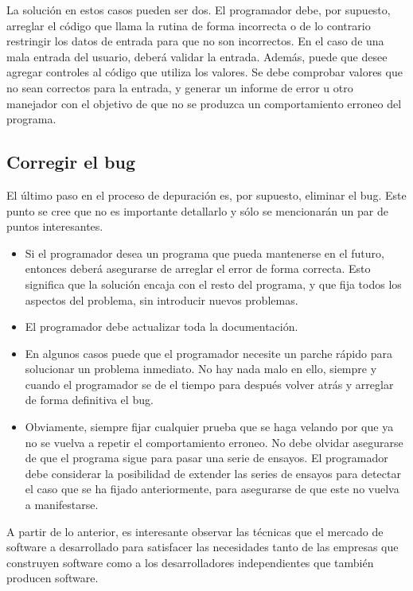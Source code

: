 \documentclass[12pt,a4paper]{report}
\begin{document}
La solución en estos casos pueden ser dos. El programador debe, por supuesto, arreglar el código que llama la rutina de forma incorrecta o de lo contrario restringir los datos de entrada para que no son incorrectos. En el caso de una mala entrada del usuario, deberá validar la entrada. Además, puede que desee agregar controles al código que utiliza los valores.  Se debe comprobar valores que no sean correctos para la entrada, y generar un informe de error u otro manejador con el objetivo de que no se produzca un comportamiento erroneo del programa.


\subsection{Corregir el bug}

El último paso en el proceso de depuración es, por supuesto, eliminar el bug. Este punto se cree que no es importante detallarlo y sólo se mencionarán un par de puntos interesantes.

\begin{itemize}
    \item Si el programador desea un programa que pueda mantenerse en el futuro, entonces deberá asegurarse de arreglar el error de forma correcta. Esto significa que la solución encaja con el resto del programa, y que fija todos los aspectos del problema, sin introducir nuevos problemas. 

    \item El programador debe actualizar toda la documentación. 

    \item En algunos casos puede que el programador necesite un parche rápido para solucionar un problema inmediato. No hay nada malo en ello, siempre y cuando el programador se de el tiempo para después volver atrás y arreglar de forma definitiva el bug. 

    \item Obviamente, siempre fijar cualquier prueba que se haga velando por que ya no se vuelva a repetir el comportamiento erroneo. No debe olvidar asegurarse de que el programa sigue para pasar una serie de ensayos. El programador debe considerar la posibilidad de extender las series de ensayos para detectar el caso que se ha fijado anteriormente, para asegurarse de que este no vuelva a manifestarse.
\end{itemize}

A partir de lo anterior, es interesante observar las técnicas que el mercado de software a desarrollado para satisfacer las necesidades tanto de las empresas que construyen software como a los desarrolladores independientes que también producen software.
\end{document}
